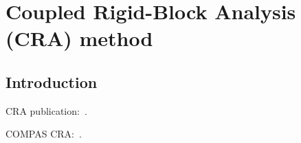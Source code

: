 \chapter{Coupled Rigid-Block Analysis (CRA) method}\label{ch:cra}

\section{Introduction}\label{sec:cra_intro}

CRA publication:~\cite{kao2022coupled}. 

COMPAS CRA:~\cite{compas-cra}. 


\cleardoublepage{}
\thispagestyle{empty}

